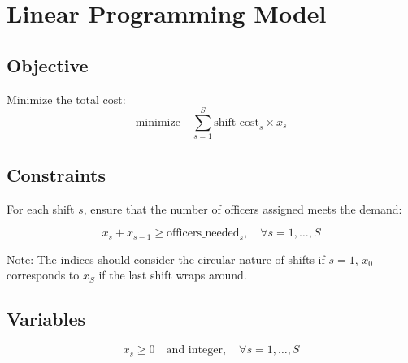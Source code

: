 \documentclass{article}
\begin{document}
\section*{Linear Programming Model}

\subsection*{Objective}

Minimize the total cost:
\[
\text{minimize} \quad \sum_{s=1}^{S} \text{shift\_cost}_s \times x_s
\]

\subsection*{Constraints}

For each shift \( s \), ensure that the number of officers assigned meets the demand:

\[
x_s + x_{s-1} \geq \text{officers\_needed}_s, \quad \forall s = 1, \ldots, S
\]

Note: The indices should consider the circular nature of shifts if \( s = 1 \), \( x_0 \) corresponds to \( x_S \) if the last shift wraps around.

\subsection*{Variables}
\[
x_s \geq 0 \quad \text{and integer}, \quad \forall s = 1, \ldots, S
\]
\end{document}
